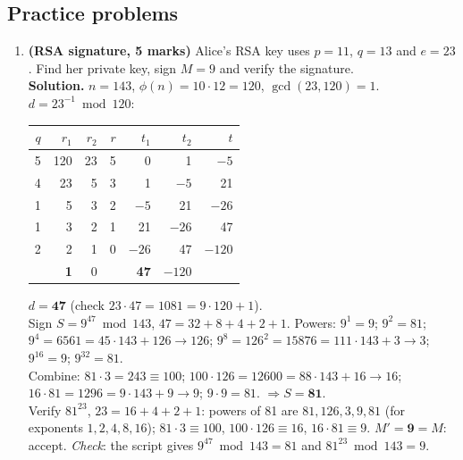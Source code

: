 \subsection*{Practice problems}
\begin{enumerate}[leftmargin=1.6em,itemsep=4pt]
  \item \textbf{(RSA signature, 5 marks)} Alice's RSA key uses $p = 11$, $q = 13$ and $e = 23$. Find her private key, sign $M = 9$ and verify the signature.\\
  \textbf{Solution.} $n = 143$, $\phi(n) = 10 \cdot 12 = 120$, $\gcd(23, 120) = 1$. $d = 23^{-1} \bmod 120$:
  \begin{center}\small
  \begin{tabular}{@{}r|rrr|rrr@{}}
  \toprule
  $q$ & $r_1$ & $r_2$ & $r$ & $t_1$ & $t_2$ & $t$\\
  \midrule
  5 & 120 & 23 & 5 & 0 & 1 & $-5$\\
  4 & 23 & 5 & 3 & 1 & $-5$ & 21\\
  1 & 5 & 3 & 2 & $-5$ & 21 & $-26$\\
  1 & 3 & 2 & 1 & 21 & $-26$ & 47\\
  2 & 2 & 1 & 0 & $-26$ & 47 & $-120$\\
   & \textbf{1} & 0 & & \textbf{47} & $-120$ & \\
  \bottomrule
  \end{tabular}
  \end{center}
  $d = \mathbf{47}$ (check $23 \cdot 47 = 1081 = 9 \cdot 120 + 1$).\\
  Sign $S = 9^{47} \bmod 143$, $47 = 32 + 8 + 4 + 2 + 1$. Powers: $9^1 = 9$; $9^2 = 81$; $9^4 = 6561 = 45 \cdot 143 + 126 \to 126$; $9^8 = 126^2 = 15876 = 111 \cdot 143 + 3 \to 3$; $9^{16} = 9$; $9^{32} = 81$.\\
  Combine: $81 \cdot 3 = 243 \equiv 100$; $100 \cdot 126 = 12600 = 88 \cdot 143 + 16 \to 16$; $16 \cdot 81 = 1296 = 9 \cdot 143 + 9 \to 9$; $9 \cdot 9 = 81$. $\Rightarrow S = \mathbf{81}$.\\
  Verify $81^{23}$, $23 = 16 + 4 + 2 + 1$: powers of 81 are $81, 126, 3, 9, 81$ (for exponents $1, 2, 4, 8, 16$); $81 \cdot 3 \equiv 100$, $100 \cdot 126 \equiv 16$, $16 \cdot 81 \equiv 9$. $M' = \mathbf{9} = M$: accept. \emph{Check}: the script gives $9^{47} \bmod 143 = 81$ and $81^{23} \bmod 143 = 9$.


\end{enumerate}
